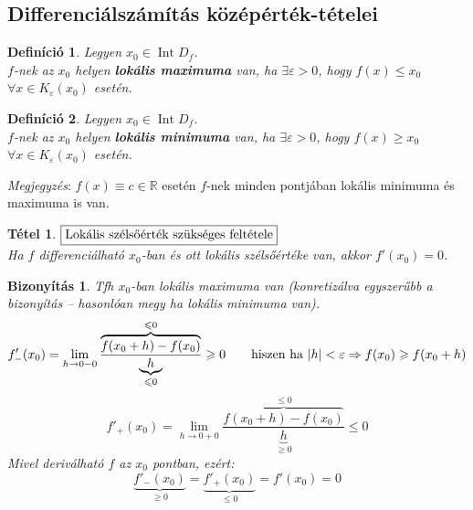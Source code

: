 \documentclass[a4paper,12pt,twoside]{book}
\DeclareMathOperator{\Int}{Int}
\newtheorem{tetel}{Tétel}[chapter]
\newtheorem{defi}{Definíció}[chapter]
\theoremstyle{break}
\newtheorem{biz}{Bizonyítás}[chapter]
\theoremstyle{plain}
\begin{document}
\subsection{Differenciálszámítás középérték-tételei}

\begin{defi} Legyen $x_0\in \Int D_f$.\\
$f$-nek az $x_0$ helyen \textbf{lokális maximuma} van, ha $\exists\varepsilon>0$, hogy $f(x)\leqslant x_0$ $\forall x\in K_\varepsilon(x_0)$ esetén.
\end{defi}

\begin{defi} Legyen $x_0\in \Int D_f$.\\
$f$-nek az $x_0$ helyen \textbf{lokális minimuma} van, ha $\exists\varepsilon>0$, hogy $f(x)\geqslant x_0$ $\forall x\in K_\varepsilon(x_0)$ esetén.
\end{defi}

\textit{Megjegyzés}: $f(x)\equiv c\in\mathbb{R}$ esetén $f$-nek minden pontjában lokális minimuma és maximuma is van.

\begin{tetel} \label{LokalisSzelsoertekSzukFeltetel} $\boxed{$Lokális szélsőérték szükséges feltétele$}$\\
Ha $f$ differenciálható $x_0$-ban és ott lokális szélsőértéke van, akkor $f'(x_0) = 0$.
\end{tetel}
\begin{biz}
 Tfh $x_0$-ban lokális maximuma van (konretizálva egyszerűbb a bizonyítás -- hasonlóan megy ha lokális minimuma van).\\
 \[f'_-(x_0) = \lim_{h\to 0-0} \frac{\overbrace{f(x_0+h)-f(x_0)}^{\leqslant 0}}{\underbrace{h}_{\leqslant 0}} \geqslant 0 \qquad \hbox{hiszen ha } |h|<\varepsilon \Rightarrow f(x_0)\geqslant f(x_0+h)\]
 \[f'_+(x_0) = \lim_{h\to 0+0} \frac{\overbrace{f(x_0+h)-f(x_0)}^{\leqslant 0}}{\underbrace{h}_{\geqslant 0}} \leqslant 0 \]
 Mivel deriválható $f$ az $x_0$ pontban, ezért:
 \[\underbrace{f'_-(x_0)}_{\geqslant 0} = \underbrace{f'_+(x_0)}_{\leqslant 0} = f'(x_0) = 0\]
\end{biz}
\end{document}
